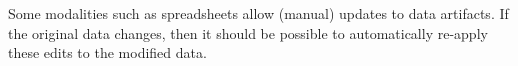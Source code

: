 Some modalities such as spreadsheets allow (manual) updates to data artifacts. 
If the original data changes, then it should be possible to automatically re-apply these edits to the modified data.



